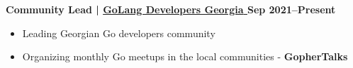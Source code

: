 \textbf{Community Lead | 
\href{https://www.facebook.com/groups/401540801324714}{
    {GoLang Developers Georgia} 
} \hfill Sep 2021--Present}

\begin{itemize}[label=$\bullet$]
	\item Leading Georgian Go developers community
	\item Organizing monthly Go meetups in the local communities - \textbf{GopherTalks}
\end{itemize}\par

